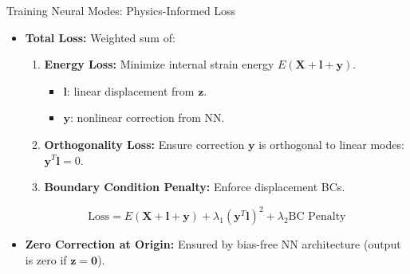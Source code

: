 \documentclass{beamer}
\begin{document}
\begin{frame}{Training Neural Modes: Physics-Informed Loss}
    \begin{itemize}
        \item \textbf{Total Loss:} Weighted sum of:
        \begin{enumerate}
            \item \textbf{Energy Loss:} Minimize internal strain energy \(E(\bm{X} + \bm{l} + \bm{y})\).
            \begin{itemize}
                \item \(\bm{l}\): linear displacement from \(\bm{z}\).
                \item \(\bm{y}\): nonlinear correction from NN.
            \end{itemize}
            \item \textbf{Orthogonality Loss:} Ensure correction \(\bm{y}\) is orthogonal to linear modes: \(\bm{y}^T \bm{l} = 0\).
            \item \textbf{Boundary Condition Penalty:} Enforce displacement BCs.
        \end{enumerate}
        \begin{equation*}
            \text{Loss} = E(\bm{X} + \bm{l} + \bm{y}) + \lambda_1 (\bm{y}^T \bm{l})^2 + \lambda_2 \text{BC Penalty}
        \end{equation*}
        \item \textbf{Zero Correction at Origin:} Ensured by bias-free NN architecture (output is zero if \(\bm{z}=\bm{0}\)).
    \end{itemize}
\end{frame}
\end{document}
